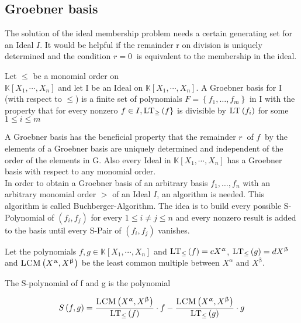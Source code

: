 \subsection{Groebner basis}
\label{subsec:Groebner}

The solution of the ideal membership problem needs a certain generating set for an Ideal $I$. It would be helpful if the remainder r on division is uniquely determined and the condition $ r = 0~$ is equivalent to the membership in the ideal.



\begin{env_definition}
\cite{KHZ}
Let $\leq$ be a monomial order on \\ $\mathbb{K}\left[X_{1}, \cdots, X_{n}\right]$ and let I be an Ideal on $ \mathbb{K}\left[X_{1}, \cdots, X_{n}\right]  $. A Groebner basis for I (with respect to $\leq$) is a finite set of polynomials $ F = \left\lbrace f_{1}, \ldots , f_{m} \right\rbrace $ in I with the property that for every nonzero $ f \in I , \textsc{LT}_{\geq}\left( f\right\rbrace $ is divisible by $\textsc{LT}\left( f_{i}\right) $ for some $ 1 \leq i \leq m $

\end{env_definition}

A Groebner basis has the beneficial property that the remainder $r~$ of $f~$ by the elements of a Groebner basis are uniquely determined and independent of the order of the elements in G.
Also every Ideal in $\mathbb{K}\left[X_{1}, \cdots, X_{n}\right]$ has a Groebner basis with respect to any monomial order\cite{KHZ}.\\ 


In order to obtain a Groebner basis of an arbitrary basis $f_{1}, \ldots , f_{n}$ with an arbitrary monomial order $>$ of an Ideal $I$, an algorithm is needed. This algorithm is called Buchberger-Algorithm. The idea is to build every possible S-Polynomial of $\left( f_{i},f_{j}\right) $ for every $ 1 \leq i \neq j \leq n $ and every nonzero result is added to the basis until every S-Pair of $\left( f_{i},f_{j}\right) $ vanishes.

Let the polynomials $f,g \in \mathbb{K}\left[X_{1}, \cdots, X_{n}\right] $ and $\textsc{LT}_{\leq}\left(f \right) = cX^{\upalpha} $, $\textsc{LT}_{\leq}\left(g \right) = dX^{\upbeta} $ and $\textsc{LCM}\left( X^{\upalpha},X^{\upbeta}\right) $ be the least common multiple between $X^{\upalpha}$ and $X^{\upbeta}$. 

\begin{env_definition}[S-Polynomial]
\cite{KHZ} The S-polynomial of f and g is the polynomial

\[ S\left( f,g\right) = \frac{\textsc{LCM}\left( X^{\upalpha}, X^{\upbeta}\right) }{\textsc{LT}_{\leq}\left( f\right) } \cdot f - \frac{ \textsc{LCM}\left( X^{\upalpha}, X^{\upbeta}\right) }{\textsc{LT}_{\leq}\left( g\right) } 
\cdot g \]


\end{env_definition}

